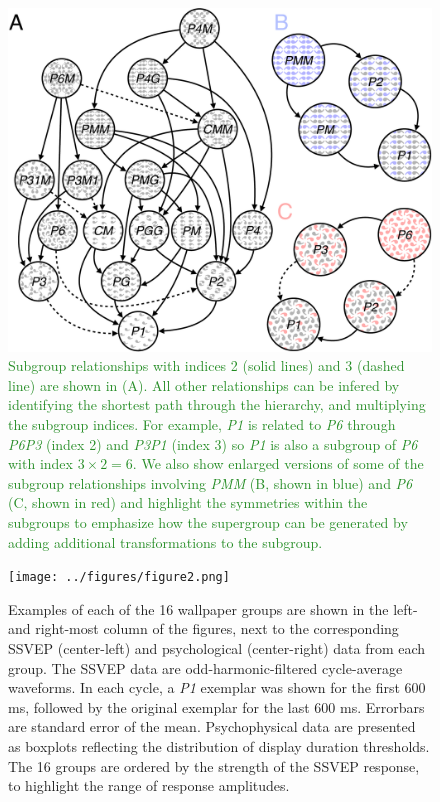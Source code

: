 \documentclass[11pt, twoside]{article}
\begin{document}
\begin{figure}[hptb]
\centering
\includegraphics[width=0.75\linewidth]{../figures/figure1.pdf}
\caption{\textcolor{ForestGreen}{Subgroup relationships with indices 2 (solid lines) and 3 (dashed line) are shown in (A). All other relationships can be infered by identifying the shortest path through the hierarchy, and multiplying the subgroup indices. For example, \textit{P1} is related to \textit{P6} through \textit{P6}\textrightarrow\textit{P3} (index 2) and \textit{P3}\textrightarrow\textit{P1} (index 3) so \textit{P1} is also a subgroup of \textit{P6} with index $3 \times 2 = 6$. We also show enlarged versions of some of the subgroup relationships involving \textit{PMM} (B, shown in blue) and \textit{P6} (C, shown in red) and highlight the symmetries within the subgroups to emphasize how the supergroup can be generated by adding additional transformations to the subgroup.}}
\end{figure}

\begin{figure}[hp]
\centering
\texttt{[image: ../figures/figure2.png]}
\caption{Examples of each of the 16 wallpaper groups are shown in the left- and right-most column of the figures, next to the corresponding SSVEP (center-left) and psychological (center-right) data from each group. The SSVEP data are odd-harmonic-filtered cycle-average waveforms. In each cycle, a \textit{P1} exemplar was shown for the first 600 ms, followed by the original exemplar for the last 600 ms. Errorbars are standard error of the mean. Psychophysical data are presented as boxplots reflecting the distribution of display duration thresholds. The 16 groups are ordered by the strength of the SSVEP response, to highlight the range of response amplitudes.}
\label{fig:example_stimuli}
\end{figure}
\end{document}
